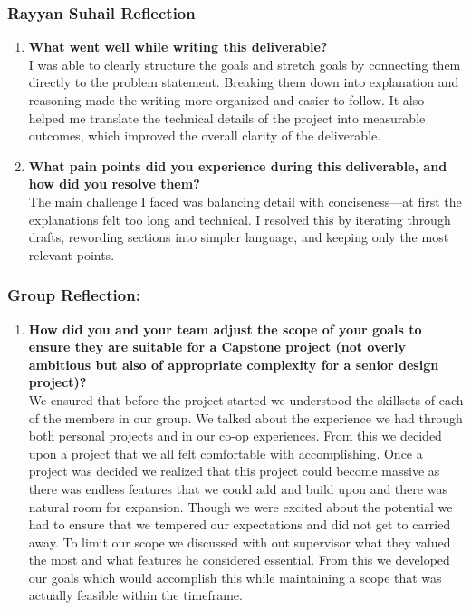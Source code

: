 \documentclass{article}
\begin{document}
\subsubsection*{Rayyan Suhail Reflection}
\begin{enumerate}
    \item \textbf{What went well while writing this deliverable? } \\
    I was able to clearly structure the goals and stretch goals by connecting them directly to the problem statement. Breaking them down into explanation and reasoning made the writing more organized and easier to follow. It also helped me translate the technical details of the project into measurable outcomes, which improved the overall clarity of the deliverable.
    \item \textbf{What pain points did you experience during this deliverable, and how did you resolve them?} \\ 
    The main challenge I faced was balancing detail with conciseness—at first the explanations felt too long and technical. I resolved this by iterating through drafts, rewording sections into simpler language, and keeping only the most relevant points.
    
\end{enumerate} 

\subsubsection*{Group Reflection:}
\begin{enumerate}
    \item \textbf{How did you and your team adjust the scope of your goals to ensure they are suitable for a Capstone project (not overly ambitious but also of appropriate complexity for a senior design project)?} \\
    We ensured that before the project started we understood the skillsets of each of the members in our group. We talked about the experience we had through both personal projects and in our co-op experiences. From this we decided upon a project that we all felt comfortable with accomplishing. Once a project was decided we realized that this project could become massive as there was endless features that we could add and build upon and there was natural room for expansion. Though we were excited about the potential we had to ensure that we tempered our expectations and did not get to carried away. To limit our scope we discussed with out supervisor what they valued the most and what features he considered essential. From this we developed our goals which would accomplish this while maintaining a scope that was actually feasible within the timeframe. 
\end{enumerate} 
\end{document}
